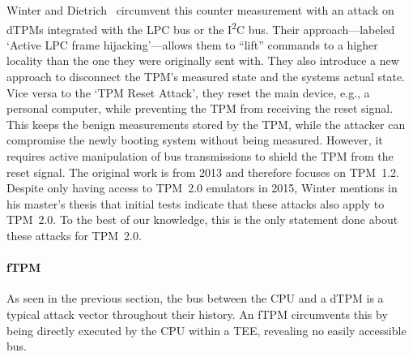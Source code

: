 Winter and Dietrich~\cite{Winter2013} circumvent this counter measurement with an attack on \acp{dTPM} integrated with the LPC bus or the I\textsuperscript{2}C bus.
Their approach---labeled `Active LPC frame hijacking'---allows them to ``lift'' commands to a higher locality than the one they were originally sent with.
They also introduce a new approach to disconnect the \ac{TPM}'s measured state and the systems actual state.
Vice versa to the `TPM Reset Attack', they reset the main device, e.g., a personal computer, while preventing the TPM from receiving the reset signal.
This keeps the benign measurements stored by the TPM, while the attacker can compromise the newly booting system without being measured.
However, it requires active manipulation of bus transmissions to shield the \ac{TPM} from the reset signal.
The original work is from 2013 and therefore focuses on TPM~1.2.
Despite only having access to TPM~2.0 emulators in 2015, Winter mentions in his master's thesis that initial tests indicate that these attacks also apply to TPM~2.0.
To the best of our knowledge, this is the only statement done about these attacks for TPM~2.0.




\paragraph{\Acl{fTPM}}

As seen in the previous section, the bus between the CPU and a \ac{dTPM} is a typical attack vector throughout their history.
An \ac{fTPM} circumvents this by being directly executed by the CPU within a \ac{TEE}, revealing no easily accessible bus.


